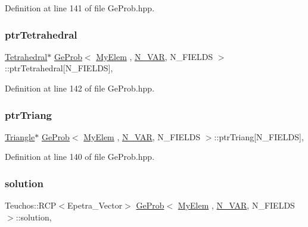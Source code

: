 Definition at line 141 of file Ge\+Prob.\+hpp.

\mbox{\label{classGeProb_a4e2d7b57253812234e2417097659c40c}} 
\subsubsection{\texorpdfstring{ptr\+Tetrahedral}{ptrTetrahedral}}
{\footnotesize\ttfamily \hyperlink{classTetrahedral}{Tetrahedral}$\ast$ \hyperlink{classGeProb}{Ge\+Prob}$<$ \hyperlink{DG__Prob_8h_a83cd887ced9a6587428f267e50cd4787}{My\+Elem} , \hyperlink{classED__Prob_a4e7d2ff1a8e435e336fb00c527224b5a}{N\+\_\+\+V\+AR}, N\+\_\+\+F\+I\+E\+L\+DS $>$\+::ptr\+Tetrahedral\mbox{[}N\+\_\+\+F\+I\+E\+L\+DS\mbox{]}\hspace{0.3cm}{\ttfamily [protected]}, {\ttfamily [inherited]}}



Definition at line 142 of file Ge\+Prob.\+hpp.

\mbox{\label{classGeProb_a9fa6ab6ca8b9a2352642a72042d8cf4d}} 
\subsubsection{\texorpdfstring{ptr\+Triang}{ptrTriang}}
{\footnotesize\ttfamily \hyperlink{classTriangle}{Triangle}$\ast$ \hyperlink{classGeProb}{Ge\+Prob}$<$ \hyperlink{DG__Prob_8h_a83cd887ced9a6587428f267e50cd4787}{My\+Elem} , \hyperlink{classED__Prob_a4e7d2ff1a8e435e336fb00c527224b5a}{N\+\_\+\+V\+AR}, N\+\_\+\+F\+I\+E\+L\+DS $>$\+::ptr\+Triang\mbox{[}N\+\_\+\+F\+I\+E\+L\+DS\mbox{]}\hspace{0.3cm}{\ttfamily [protected]}, {\ttfamily [inherited]}}



Definition at line 140 of file Ge\+Prob.\+hpp.

\mbox{\label{classGeProb_af084ddda2d2d48a332141881d7b22a7d}} 
\subsubsection{\texorpdfstring{solution}{solution}}
{\footnotesize\ttfamily Teuchos\+::\+R\+CP$<$Epetra\+\_\+\+Vector$>$ \hyperlink{classGeProb}{Ge\+Prob}$<$ \hyperlink{DG__Prob_8h_a83cd887ced9a6587428f267e50cd4787}{My\+Elem} , \hyperlink{classED__Prob_a4e7d2ff1a8e435e336fb00c527224b5a}{N\+\_\+\+V\+AR}, N\+\_\+\+F\+I\+E\+L\+DS $>$\+::solution\hspace{0.3cm}{\ttfamily [protected]}, {\ttfamily [inherited]}}



